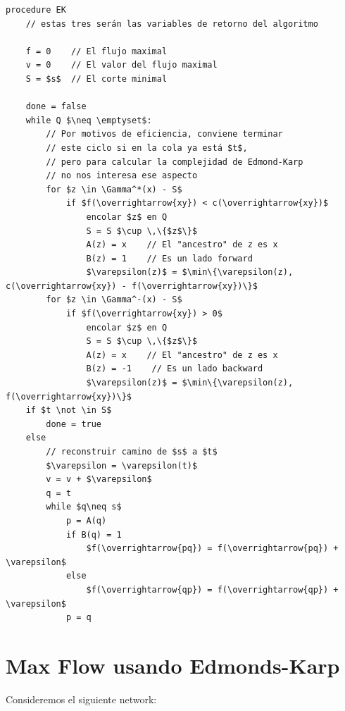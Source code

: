 \documentclass[10pt,a4paper]{article}
\begin{document}
    \begin{lstlisting}[language=pseudo]
procedure EK
    // estas tres serán las variables de retorno del algoritmo

    f = 0    // El flujo maximal
    v = 0    // El valor del flujo maximal
    S = $s$  // El corte minimal

    done = false
    while Q $\neq \emptyset$:
        // Por motivos de eficiencia, conviene terminar
        // este ciclo si en la cola ya está $t$,
        // pero para calcular la complejidad de Edmond-Karp
        // no nos interesa ese aspecto
        for $z \in \Gamma^*(x) - S$
            if $f(\overrightarrow{xy}) < c(\overrightarrow{xy})$
                encolar $z$ en Q
                S = S $\cup \,\{$z$\}$
                A(z) = x    // El "ancestro" de z es x
                B(z) = 1    // Es un lado forward
                $\varepsilon(z)$ = $\min\{\varepsilon(z), c(\overrightarrow{xy}) - f(\overrightarrow{xy})\}$
        for $z \in \Gamma^-(x) - S$
            if $f(\overrightarrow{xy}) > 0$
                encolar $z$ en Q
                S = S $\cup \,\{$z$\}$
                A(z) = x    // El "ancestro" de z es x
                B(z) = -1    // Es un lado backward
                $\varepsilon(z)$ = $\min\{\varepsilon(z), f(\overrightarrow{xy})\}$
    if $t \not \in S$
        done = true
    else
        // reconstruir camino de $s$ a $t$
        $\varepsilon = \varepsilon(t)$
        v = v + $\varepsilon$
        q = t
        while $q\neq s$
            p = A(q) 
            if B(q) = 1
                $f(\overrightarrow{pq}) = f(\overrightarrow{pq}) + \varepsilon$
            else
                $f(\overrightarrow{qp}) = f(\overrightarrow{qp}) + \varepsilon$
            p = q
\end{lstlisting}

\section*{Max Flow usando Edmonds-Karp}

Consideremos el siguiente network:
\end{document}
